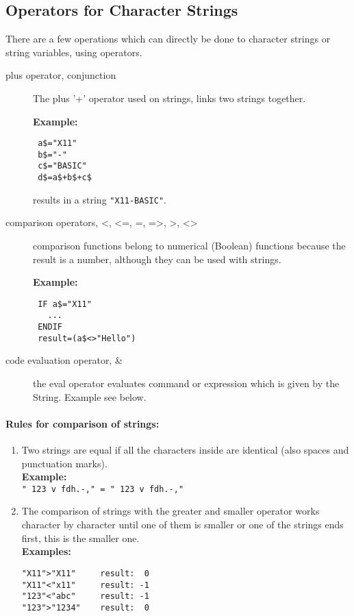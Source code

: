 \subsection*{Operators for Character Strings}
There are a few operations which can directly be done to character strings 
or string variables, using operators.
\begin{description}
\item[plus operator, conjunction] The plus '+' operator used on strings, links 
two strings together. 
\begin{mdframed}[hidealllines=true,backgroundcolor=blue!20]
{\bf Example:} 
 \begin{verbatim}
 a$="X11"
 b$="-"
 c$="BASIC"
 d$=a$+b$+c$
 \end{verbatim}\end{mdframed}
 results in a string \verb|"X11-BASIC"|.
\item[comparison operators, <, <=, =, =>, >, <>] comparison functions belong to
numerical (Boolean) functions because the result is a number, although they
can be used with strings.
\begin{mdframed}[hidealllines=true,backgroundcolor=blue!20]
{\bf Example:} 
 \begin{verbatim}
 IF a$="X11"
   ...
 ENDIF
 result=(a$<>"Hello")
 \end{verbatim}\end{mdframed}
\item[code evaluation operator, \&] the eval operator evaluates command or
expression which is given by the String. Example see below.
\end{description}

\paragraph{Rules for comparison of strings:}
\begin{enumerate}
\item	Two strings are equal if all the characters inside are identical
	(also spaces and punctuation marks).\\
 {\bf Example:}\\
	\verb|" 123 v fdh.-," = " 123 v fdh.-,"|

\item The comparison of strings with the greater and smaller operator 
works character by character until one
of them is smaller or one of the strings ends first, this is the smaller
one.\\
 {\bf Examples:}\\
\begin{verbatim}
"X11">"X11"     result:  0
"X11"<"x11"     result: -1
"123"<"abc"     result: -1
"123">"1234"    result:  0
\end{verbatim}
\end{enumerate}

